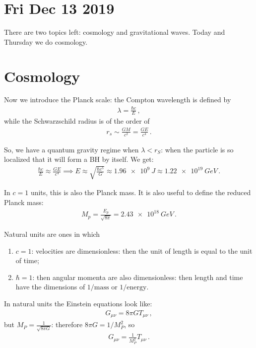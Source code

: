 \documentclass[main.tex]{subfiles}
\begin{document}
\section*{Fri Dec 13 2019}

There are two topics left: cosmology and gravitational waves. 
Today and Thursday we do cosmology. 

\section{Cosmology}

Now we introduce the Planck scale: the Compton wavelength is defined by  
%
\begin{align}
  \lambda = \frac{\hbar c }{E}
\,,
\end{align}
%
while the Schwarzschild radius is of the order of 
%
\begin{align}
  r_s \sim \frac{GM}{c^2} = \frac{GE}{c^{4}}
\,.
\end{align}

So, we have a quantum gravity regime when \(\lambda < r_S\): when the particle is so localized that it will form a BH by itself. We get: 
%
\begin{align}
  \frac{\hbar c}{E} \approx \frac{GE}{c^{4}} \implies
  E \approx \sqrt{\frac{\hbar c^{5}}{G}} \approx \SI{1.96e9}{J} \approx \SI{1.22e19}{GeV}
\,.
\end{align}

In \(c=1\) units, this is also the Planck mass.
It is also useful to define the reduced Planck mass:
%
\begin{align}
  M_p = \frac{E_p}{\sqrt{8 \pi }} = \SI{2.43e18}{GeV}
\,.
\end{align}

Natural units are ones in which 
\begin{enumerate}
    \item \(c=1\): velocities are dimensionless: then the unit of length is equal to the unit of time; 
    \item \(\hbar = 1\): then angular momenta are also dimensionless: then length and time have the dimensions of \(1/\text{mass}\) or \(1/\text{energy}\). 
\end{enumerate}

In natural units the Einstein equations look like: 
%
\begin{align}
  G_{\mu \nu } = 8 \pi G T_{\mu \nu }
\,,
\end{align}
%
but \(M_P = \frac{1}{\sqrt{8 \pi G}}\): therefore \(8 \pi G = 1 / M_P^2\), so 
%
\begin{align}
  G_{\mu \nu } = \frac{1}{M_P^2} T_{\mu \nu }
\,.
\end{align}
\end{document}
